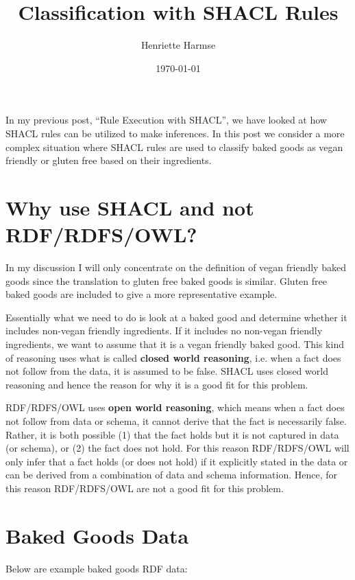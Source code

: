 \documentclass{amsart}
\title{Classification with SHACL Rules}
\author{Henriette Harmse}
\date{\today}
\begin{document}
  \maketitle
  
  In my previous post, ``Rule Execution with SHACL'', we have looked at how SHACL rules can be utilized to make inferences. In this post we consider a more complex situation where SHACL rules are used to classify baked goods as vegan friendly or gluten free based on their ingredients.

  \section{Why use SHACL and not RDF/RDFS/OWL?}
  In my discussion I will only concentrate on the definition of vegan friendly baked goods since the translation to gluten free baked goods is similar. Gluten free baked goods are included to give a more representative example.
  
  Essentially what we need to do is look at a baked good and determine whether it includes non-vegan friendly ingredients. If it includes no non-vegan friendly ingredients, we want to assume that it is a vegan friendly baked good. This kind of reasoning uses what is called \textbf{closed world reasoning}, i.e. when a fact does not follow from the data, it is assumed to be false. SHACL uses closed world reasoning and hence the reason for why it is a good fit for this problem.
  
  RDF/RDFS/OWL uses \textbf{open world reasoning}, which means when a fact does not follow from data or schema, it cannot derive that the fact is necessarily false. Rather, it is both possible (1) that the fact holds but it is not captured in data (or schema), or (2) the fact does not hold. For this reason RDF/RDFS/OWL will only infer that a fact holds (or does not hold) if it explicitly stated in the data or can be derived from a combination of data and schema information. Hence, for this reason RDF/RDFS/OWL are not a good fit for this problem.
   
  
  
  \section{Baked Goods Data}
  Below are example baked goods RDF data: 
  
\end{document}
